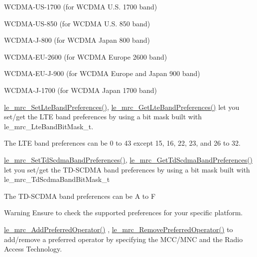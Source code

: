 \begin{DoxyItemize}
\item W\+C\+D\+M\+A-\/\+U\+S-\/1700 (for W\+C\+D\+M\+A U.\+S. 1700 band)
\item W\+C\+D\+M\+A-\/\+U\+S-\/850 (for W\+C\+D\+M\+A U.\+S. 850 band)
\item W\+C\+D\+M\+A-\/\+J-\/800 (for W\+C\+D\+M\+A Japan 800 band)
\item W\+C\+D\+M\+A-\/\+E\+U-\/2600 (for W\+C\+D\+M\+A Europe 2600 band)
\item W\+C\+D\+M\+A-\/\+E\+U-\/\+J-\/900 (for W\+C\+D\+M\+A Europe and Japan 900 band)
\item W\+C\+D\+M\+A-\/\+J-\/1700 (for W\+C\+D\+M\+A Japan 1700 band)
\end{DoxyItemize}

\hyperlink{le__mrc__interface_8h_a21d2fe7c736e9a4a342dcc461a5d6e02}{le\+\_\+mrc\+\_\+\+Set\+Lte\+Band\+Preferences()}, \hyperlink{le__mrc__interface_8h_af4ec5bd36ba8df68bc12a10618268742}{le\+\_\+mrc\+\_\+\+Get\+Lte\+Band\+Preferences()} let you set/get the L\+T\+E band preferences by using a bit mask built with {\ttfamily le\+\_\+mrc\+\_\+\+Lte\+Band\+Bit\+Mask\+\_\+t}.

The L\+T\+E band preferences can be 0 to 43 except 15, 16, 22, 23, and 26 to 32.

\hyperlink{le__mrc__interface_8h_a8765511597189b64e486fa8f17bcddcd}{le\+\_\+mrc\+\_\+\+Set\+Td\+Scdma\+Band\+Preferences()}, \hyperlink{le__mrc__interface_8h_aed41544004ed7df9de8e874b8bb09d3b}{le\+\_\+mrc\+\_\+\+Get\+Td\+Scdma\+Band\+Preferences()} let you set/get the T\+D-\/\+S\+C\+D\+M\+A band preferences by using a bit mask built with {\ttfamily le\+\_\+mrc\+\_\+\+Td\+Scdma\+Band\+Bit\+Mask\+\_\+t} 

The T\+D-\/\+S\+C\+D\+M\+A band preferences can be \textquotesingle{}A\textquotesingle{} to \textquotesingle{}F\textquotesingle{}

\begin{DoxyWarning}{Warning}
Ensure to check the supported preferences for your specific platform.
\end{DoxyWarning}
\hyperlink{le__mrc__interface_8h_ac476a122ab91d3607c4eb016e93a3bde}{le\+\_\+mrc\+\_\+\+Add\+Preferred\+Operator()} , \hyperlink{le__mrc__interface_8h_a0c2d65eb8cdb200aa4bce8766530c39f}{le\+\_\+mrc\+\_\+\+Remove\+Preferred\+Operator()} to add/remove a preferred operator by specifying the M\+C\+C/\+M\+N\+C and the Radio Access Technology.

